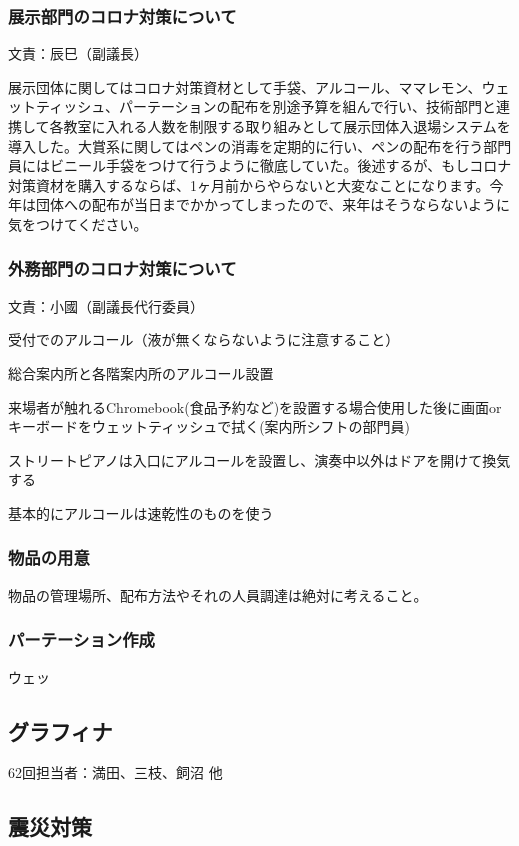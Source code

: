 \documentclass[dvipdfmx,jb5]{jarticle}
\begin{document}
\subsubsection{展示部門のコロナ対策について} 文責：辰巳（副議長） \vspace{2mm}

展示団体に関してはコロナ対策資材として手袋、アルコール、ママレモン、ウェットティッシュ、パーテーションの配布を別途予算を組んで行い、技術部門と連携して各教室に入れる人数を制限する取り組みとして展示団体入退場システムを導入した。大賞系に関してはペンの消毒を定期的に行い、ペンの配布を行う部門員にはビニール手袋をつけて行うように徹底していた。後述するが、もしコロナ対策資材を購入するならば、1ヶ月前からやらないと大変なことになります。今年は団体への配布が当日までかかってしまったので、来年はそうならないように気をつけてください。

\subsubsection{外務部門のコロナ対策について} 文責：小國（副議長代行委員） \vspace{2mm}

受付でのアルコール（液が無くならないように注意すること）

総合案内所と各階案内所のアルコール設置

来場者が触れるChromebook(食品予約など)を設置する場合使用した後に画面orキーボードをウェットティッシュで拭く(案内所シフトの部門員)

ストリートピアノは入口にアルコールを設置し、演奏中以外はドアを開けて換気する

基本的にアルコールは速乾性のものを使う

\subsubsection{物品の用意}
物品の管理場所、配布方法やそれの人員調達は絶対に考えること。

\subsubsection{パーテーション作成}
ウェッ


 \subsection{グラフィナ}
62回担当者：満田、三枝、飼沼 他

 \subsection{震災対策}
\end{document}
